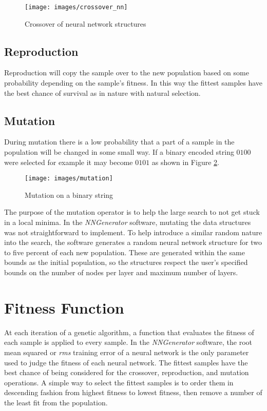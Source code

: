 \begin{figure}[h!]
  \centering
  \texttt{[image: images/crossover\_nn]}
  \caption{Crossover of neural network structures}
  \label{crossover_nn}
\end{figure}

\subsection{Reproduction}
Reproduction will copy the sample over to the new population based on some probability depending on the sample's fitness. 
In this way the fittest samples have the best chance of survival as in nature with natural selection.

\subsection{Mutation}
During mutation there is a low probability that a part of a sample in the population will be changed in some small way. 
If a binary encoded string $0100$ were selected for example it may become $0101$ as shown in Figure \ref{mutation}.

\begin{figure}[h!]
  \centering
  \texttt{[image: images/mutation]}
  \caption{Mutation on a binary string}
  \label{mutation}
\end{figure}

The purpose of the mutation operator is to help the large search to not get stuck
in a local minima.
In the {\it NNGenerator} software, mutating the data structures was not
straightforward to implement. 
To help introduce a similar random nature into the search, the software generates a random neural network structure for two to five percent of each new
population.
These are generated within the same bounds as the initial population,
so the structures respect the user's specified bounds on the number of
nodes per layer and maximum number of layers.

\section{Fitness Function}
At each iteration of a genetic algorithm, a function that evaluates the fitness of each sample is applied to every sample.
In the {\it NNGenerator} software, the root mean squared or {\it rms}
training error of a neural network is the only parameter used to
judge the fitness of each neural network.
The fittest samples have the best chance of being considered for the crossover, reproduction, and mutation operations.
A simple way to select the fittest samples is to order them in descending fashion from highest fitness to lowest fitness, then remove a number of the least fit from the population.

